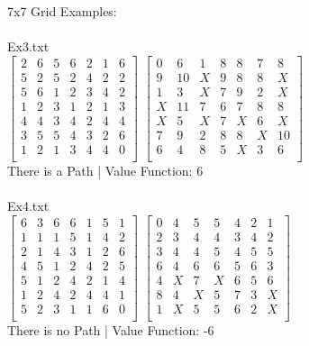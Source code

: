 \documentclass[11pt, oneside]{article}   	%
\begin{document}
7x7 Grid Examples:\\
\\
Ex3.txt\\
$
\left[
	\begin{array}{ccccccc}
		2&6&5&6&2&1&6\\
		5&2&5&2&4&2&2\\
		5&6&1&2&3&4&2\\
		1&2&3&1&2&1&3\\
		4&4&3&4&2&4&4\\
		3&5&5&4&3&2&6\\
		1&2&1&3&4&4&0\\
	\end{array}
\right]
$
$
\left[
	\begin{array}{ccccccc}
		0&6&1&8&8&7&8\\
		9&10&X&9&8&8&X\\
		1&3&X&7&9&2&X\\
		X&11&7&6&7&8&8\\
		X&5&X&7&X&6&X\\
		7&9&2&8&8&X&10\\
		6&4&8&5&X&3&6\\
	\end{array}
\right]
$\\
There is a Path  |  Value Function: 6\\
\\
Ex4.txt\\
$
\left[
	\begin{array}{ccccccc}
		6&3&6&6&1&5&1\\
		1&1&1&5&1&4&2\\
		2&1&4&3&1&2&6\\
		4&5&1&2&4&2&5\\
		5&1&2&4&2&1&4\\
		1&2&4&2&4&4&1\\
		5&2&3&1&1&6&0\\
	\end{array}
\right]
$
$
\left[
	\begin{array}{ccccccc}
		0&4&5&5&4&2&1\\
		2&3&4&4&3&4&2\\
		3&4&4&5&4&5&5\\
		6&4&6&6&5&6&3\\
		4&X&7&X&6&5&6\\
		8&4&X&5&7&3&X\\
		1&X&5&5&6&2&X\\
	\end{array}
\right]
$\\
There is no Path  |  Value Function: -6\\
\end{document}
